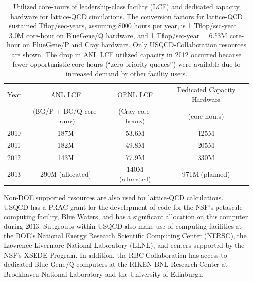 \begin{table}[t]
\begin{center}
\caption{Utilized core-hours of leadership-class facility
(LCF) and dedicated capacity hardware for lattice-QCD simulations.  The
conversion factors for lattice-QCD sustained Tflop/sec-years, assuming 8000
hours per year, is 1 Tflop/sec-year = 3.0M core-hour on BlueGene/Q hardware, and 1 Tflop/sec-year = 6.53M core-hour on
BlueGene/P and Cray hardware. Only USQCD-Collaboration resources are shown.
The drop in ANL LCF utilized capacity in 2012 occurred
because fewer opportunistic core-hours (``zero-priority queues'') were
available due to increased demand by other facility users.
\vspace{1.5mm}}
\label{tab:current}
\begin{tabular}{lccc}  
\hline\hline
Year & ANL LCF & ORNL LCF & Dedicated Capacity Hardware \\[-0.75mm]
& (BG/P + BG/Q core-hours) & (Cray core-hours) & (core-hours) \\[0.5mm]  \hline
2010 & 187M & 53.6M & 125M \\
2011 & 182M & 49.8M & 205M \\
2012 & 143M & 77.9M & 330M \\
2013 & 290M (allocated) & 140M (allocated) & 971M (planned) \\ \hline\hline
\end{tabular}
\end{center}
\end{table}

Non-DOE supported resources are also used for lattice-QCD calculations.  USQCD
has a PRAC grant for the development of code for the NSF's petascale computing
facility, Blue Waters, and has a significant allocation on this
computer during 2013.  Subgroups within USQCD also make use of computing
facilities at the DOE's National Energy Research Scientific Computing Center
(NERSC), the Lawrence Livermore National Laboratory (LLNL), and centers
supported by the NSF's XSEDE Program.  In addition, the RBC Collaboration has
access to dedicated Blue Gene/Q computers at the RIKEN BNL Research Center at
Brookhaven National Laboratory and the University of Edinburgh.

